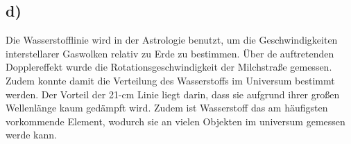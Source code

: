 \subsection{d)}

Die Wasserstofflinie wird in der Astrologie benutzt, um die Geschwindigkeiten 
interstellarer Gaswolken relativ zu Erde zu bestimmen. Über de auftretenden Dopplereffekt wurde
die Rotationsgeschwindigkeit der Milchstraße gemessen. Zudem konnte damit die
Verteilung des Wasserstoffs im Universum bestimmt werden. Der Vorteil der 
21-cm Linie liegt darin, dass sie aufgrund ihrer großen Wellenlänge kaum gedämpft wird.
Zudem ist Wasserstoff das am häufigsten vorkommende Element, wodurch sie an vielen
Objekten im universum gemessen werde kann.


